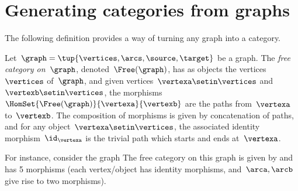 
\section[Categories from graphs]{Generating categories from graphs}
\label{sec:catsfromgraphs}

The following definition provides a way of turning any graph into a category.

\begin{ctdefinition}
    \label{def:free-category}
    Let~$\graph=\tup{\vertices,\arcs,\source,\target}$ be a graph.
    The \emph{free category on~$\graph$}, denoted~$\Free(\graph)$, has as objects the vertices~$\vertices$ of~$\graph$, and given vertices~$\vertexa\setin \vertices$ and~$\vertexb\setin \vertices$, the morphisms~$\HomSet{\Free(\graph)}{\vertexa}{\vertexb}$ are the paths from~$\vertexa$ to~$\vertexb$.
    The composition of morphisms is given by concatenation of paths, and for any object~$\vertexa \setin \vertices$, the associated identity morphism~$\id_\vertexa$ is the trivial path which starts and ends at~$\vertexa$.
\end{ctdefinition}

For instance, consider the graph
The free category on this graph is given by
and has 5 morphisms (each vertex/object has identity morphisms, and~$\arca,\arcb$ give rise to two morphisms).

